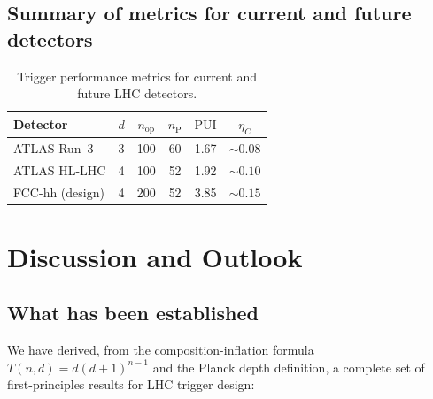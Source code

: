\documentclass[twocolumn,10pt,a4paper]{article}
\theoremstyle{thmstyle}
\theoremstyle{definition}
\theoremstyle{remark}
\newcommand{\nP}{n_{\mathrm{P}}}
\newcommand{\etaC}{\eta_{C}}
\newcommand{\PUI}{\mathrm{PUI}}
\begin{document}
\subsection{Summary of metrics for current and future detectors}

\begin{table}[h]
\centering\small
\caption{Trigger performance metrics for current and future LHC detectors.}
\label{tab:metrics}
\begin{tabular}{lccccc}
\toprule
Detector & $d$ & $n_{\mathrm{op}}$ & $\nP$ & $\PUI$ & $\etaC$ \\
\midrule
ATLAS Run~3 & 3 & 100 & 60 & 1.67 & $\sim 0.08$ \\
ATLAS HL-LHC & 4 & 100 & 52 & 1.92 & $\sim 0.10$ \\
FCC-hh (design) & 4 & 200 & 52 & 3.85 & $\sim 0.15$ \\
\bottomrule
\end{tabular}
\end{table}

\section{Discussion and Outlook}
\label{sec:discussion}

\subsection{What has been established}

We have derived, from the composition-inflation formula $T(n,d) = d(d+1)^{n-1}$
and the Planck depth definition, a complete set of first-principles results
for LHC trigger design:
\end{document}

